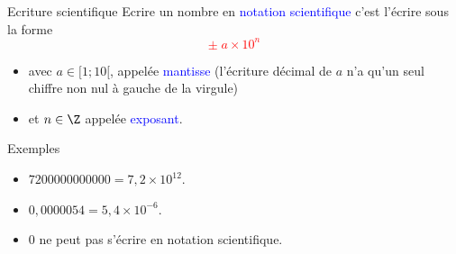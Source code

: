 \documentclass[10pt]{beamer}
\begin{document}
\begin{frame}{\Ctitle}{\stitle}
	\begin{block}{\textcolor{yellow}{\small \rappel} Ecriture scientifique}
		Ecrire un nombre en \textcolor{blue}{notation scientifique} c'est l'écrire sous la forme
		\onslide<2->\textcolor{red}{$$\boxed{\pm \; a \times 10^n}$$} \vspace{-0.5cm}
		\begin{itemize}
			\item<3-> avec $a \in [1;10[$, appelée \textcolor{blue}{mantisse} (l'écriture  décimal de $a$ n'a qu'un seul chiffre non nul à gauche de la virgule)
			\item<4-> et $n \in \Z$ appelée \textcolor{blue}{exposant}.
		\end{itemize}
	\end{block}
	\begin{exampleblock}{Exemples}
		\begin{itemize}
			\item<5-> $7200000000000 = 7,2 \times 10^{12}$.
			\item<6-> $0,0000054 = 5,4 \times 10^{-6}$.
			\item<7-> 0 ne peut pas s'écrire en notation scientifique.
		\end{itemize}
	\end{exampleblock}
\end{frame}
\end{document}
